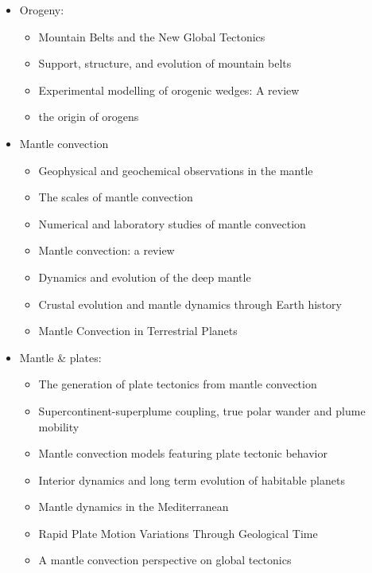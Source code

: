 \begin{itemize}
\item Orogeny:
   \begin{itemize}
   \item [\nineteenseventy] Mountain Belts and the New Global Tectonics  \cite{debi70}
   \item [\nineteeneightyeight] Support, structure, and evolution of mountain belts \cite{moly88}
   \item [\twothousandtwelve] Experimental modelling of orogenic wedges: A review \cite{grmd12} 
   \item [\twothousandthirteen] the origin of orogens \cite{jabe13}
   \end{itemize}

\item Mantle convection 

   \begin{itemize}
   \item [\nineteenninetytwo] Geophysical and geochemical observations in the mantle \cite{dari92}
   \item [\nineteenninetyeight] The scales of mantle convection \cite{ande98}
   \item [\twothousandfive] Numerical and laboratory studies of mantle convection \cite{taxn05}
   \item [\twothousandeight] Mantle convection: a review \cite{ogaw08}
   \item [\twothousandtwelve] Dynamics and evolution of the deep mantle  \cite{tack12}
   \item [\twothousandeighteen] Crustal evolution and mantle dynamics through Earth history \cite{kore18}
   \item [\twothousandtwenty] Mantle Convection in Terrestrial Planets \cite{mube20}
   \end{itemize}

\item Mantle \& plates:
   \begin{itemize}
   \item [\twothousandthree] The generation of plate tectonics from mantle convection \cite{berc03}
   \item [\twothousandnine] Supercontinent-superplume coupling, true polar wander and plume mobility \cite{lizh09}
   \item [\twothousandeleven] Mantle convection models featuring plate tectonic behavior \cite{lowm11}
   \item [\twothousandtwelve] Interior dynamics and long term evolution of habitable planets \cite{taab12}
   \item [\twothousandfourteen] Mantle dynamics in the Mediterranean \cite{faba14}
   \item [\twothousandfifteen] Rapid Plate Motion Variations Through Geological Time \cite{iabu15}
   \item [\twothousandseventeen] A mantle convection perspective on global tectonics \cite{cogu17}
   \end{itemize}


\end{itemize}

